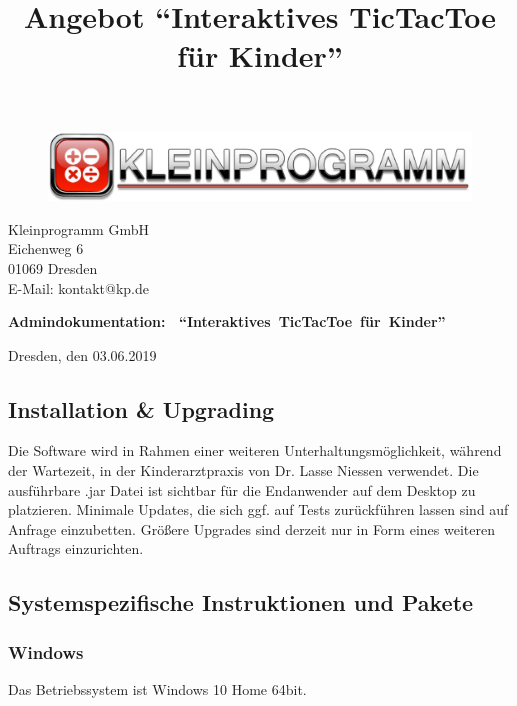 \documentclass[12pt]{article}
\title{Angebot "`Interaktives TicTacToe für Kinder"'}
\begin{document}
\begin{center}
\begin{figure}
\includegraphics[scale=0.9]{banner.pdf}
\end{figure}
\end{center}

\small
\begin{flushright}
Kleinprogramm GmbH\\
Eichenweg 6\\
01069 Dresden\\ 
E-Mail: kontakt@kp.de
\end{flushright}


\vspace*{10mm}

\large \textbf{Admindokumentation: \ "`Interaktives\ TicTacToe\ für\ Kinder"'}

\normalsize
\begin{flushright}
Dresden, den 03.06.2019\\
\end{flushright}

\vspace*{7mm}

\tableofcontents
\newpage

\subsection{Installation & Upgrading}
Die Software wird in Rahmen einer weiteren Unterhaltungsmöglichkeit, während der Wartezeit, in der Kinderarztpraxis von Dr. Lasse Niessen verwendet.
Die ausführbare .jar Datei ist sichtbar für die Endanwender auf dem Desktop zu platzieren.
Minimale Updates, die sich ggf. auf Tests zurückführen lassen sind auf Anfrage einzubetten.
Größere Upgrades sind derzeit nur in Form eines weiteren Auftrags einzurichten.
\subsection{Systemspezifische Instruktionen und Pakete}
\subsubsection{Windows}
Das Betriebssystem ist Windows 10 Home 64bit.
\end{document}
